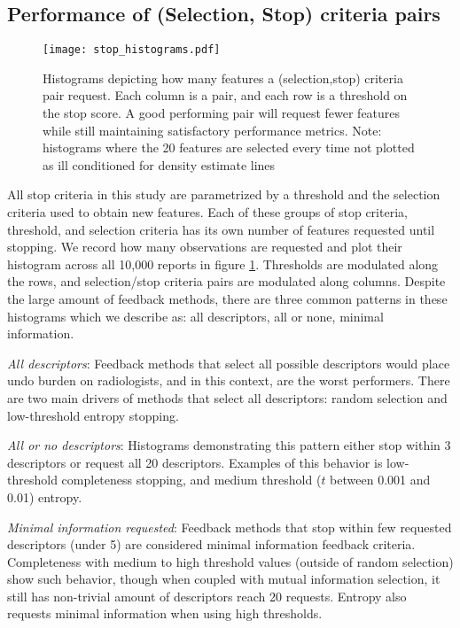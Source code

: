  
 
\subsection{Performance of (Selection, Stop) criteria pairs}

\begin{figure}[hb]
	\centering
	\texttt{[image: stop\_histograms.pdf]}
	\caption[Histograms of number of features selected for feedback]{Histograms depicting how many features a (selection,stop) criteria pair request. Each column is a pair, and each row is a threshold on the stop score. A good performing pair will request fewer features while still maintaining satisfactory performance metrics. Note: histograms where the 20 features are selected every time not plotted as ill conditioned for density estimate lines}
	\label{fig:feedback_stop_histograms}
\end{figure}

All stop criteria in this study are parametrized by a threshold and the selection criteria used to obtain new features. Each of these groups of stop criteria, threshold, and selection criteria has its own number of features requested until stopping. We record how many observations are requested and plot their histogram across all 10,000 reports in figure \ref{fig:feedback_stop_histograms}. Thresholds are modulated along the rows, and selection/stop criteria pairs are modulated along columns. Despite the large amount of feedback methods, there are three common patterns in these histograms which we describe as: all descriptors, all or none, minimal information.

\emph{All descriptors}:
Feedback methods that select all possible descriptors would place undo burden on radiologists, and in this context, are the worst performers. There are two main drivers of methods that select all descriptors: random selection and low-threshold entropy stopping. 

\emph{All or no descriptors}:
Histograms demonstrating this pattern either stop within 3 descriptors or request all 20 descriptors. Examples of this behavior is low-threshold completeness stopping, and medium threshold ($t$ between 0.001 and 0.01) entropy.

\emph{Minimal information requested}:
Feedback methods that stop within few requested descriptors (under 5) are considered minimal information feedback criteria. Completeness with medium to high threshold values (outside of random selection) show such behavior, though when coupled with mutual information selection, it still has non-trivial amount of descriptors reach 20 requests. Entropy also requests minimal information when using high thresholds.
 

